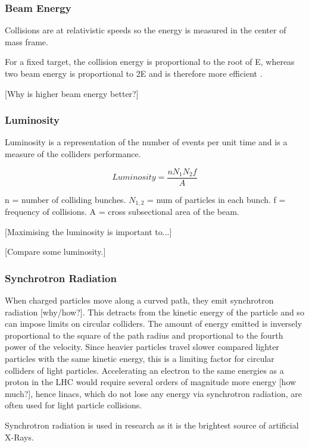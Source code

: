  \subsubsection{Beam Energy}
 
 Collisions are at relativistic speeds so the energy is measured in the center of mass frame.
 
 For a fixed target, the collision energy is proportional to the root of E, whereas two beam energy is proportional to 2E and is therefore more efficient \cite{ITP:Energy}.
 
 [Why is higher beam energy better?]
 
 \subsubsection{Luminosity}
 
 Luminosity is a representation of the number of events per unit time and is a measure of the colliders performance. 
 
 $$
 Luminosity = \frac{n N_1 N_2 f}{A}
 $$
 
 n = number of colliding bunches. $N_{1,2}$ = num of particles in each bunch. f = frequency of collisions. A = cross subsectional area of the beam.
 
 [Maximising the luminosity is important to...]
 
 [Compare some luminosity.]
 
 \subsubsection{Synchrotron Radiation}
 
 When charged particles move along a curved path, they emit synchrotron radiation [why/how?]. This detracts from the kinetic energy of the particle and so can impose limits on circular colliders. 
 The amount of energy emitted is inversely proportional to the square of the path radius and proportional to the fourth power of the velocity.  
 Since heavier particles travel slower compared lighter particles with the same kinetic energy, this is a limiting factor for circular colliders of light particles. Accelerating an electron to the same energies as a proton in the LHC would require several orders of magnitude more energy [how much?], hence linacs, which do not lose any energy via synchrotron radiation, are often used for light particle collisions.
 
 Synchrotron radiation is used in research as it is the brightest source of artificial X-Rays.
 
